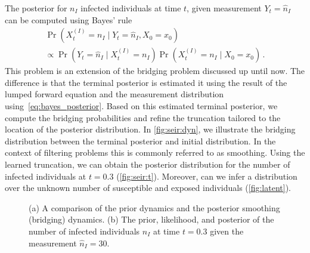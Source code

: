 The posterior for $n_I$ infected individuals at time $t$, given
measurement $Y_t=\hat{n}_I$ can be computed using  Bayes' rule
\begin{multline}\label{eq:bayes_posterior}
  \Pr(X_t^{(I)}=n_I\mid Y_t=\hat{n}_I, X_0=x_0)\\ \propto
  \Pr(Y_t=\hat{n}_I\mid X_t^{(I)} = n_I)\Pr(X_t^{(I)}=n_I\mid X_0=x_0)\,.
\end{multline}
This problem is an extension of the bridging problem discussed up until now.
The difference is that the terminal posterior   is   estimated it
using the result of the lumped forward equation and the measurement
distribution using~\eqref{eq:bayes_posterior}.
Based on this estimated terminal posterior, we compute the bridging
probabilities and refine the truncation tailored to the location of
the posterior distribution.
In \autoref{fig:seir:dyn}, we illustrate the bridging distribution
between the terminal posterior and initial distribution.
In the context of filtering problems this is commonly referred to as smoothing.
Using the learned truncation, we can obtain the posterior
distribution for the number of infected individuals at $t=0.3$
(\autoref{fig:seir:t}).
Moreover, can we infer a distribution over the unknown number of
susceptible and exposed individuals (\autoref{fig:latent}).
\begin{figure}[t]
  \myfloatalign
  \caption[Bayesian estimation on the \ac{SEIR} model]{
    (a) A comparison of the prior dynamics and the posterior
    smoothing (bridging) dynamics.
    (b) The prior, likelihood, and posterior of the number of infected
  individuals $n_I$ at time $t=0.3$ given the measurement $\hat{n}_I=30$.}
\end{figure}
